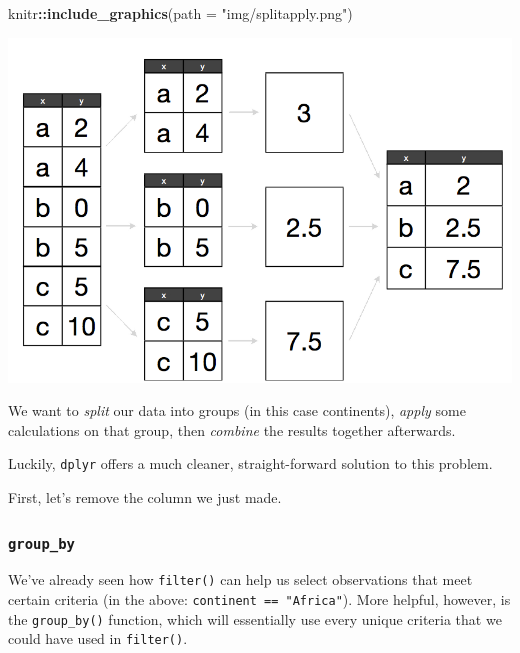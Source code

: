 \documentclass[]{book}
\newenvironment{Shaded}{\begin{snugshade}}{\end{snugshade}}
\newcommand{\KeywordTok}[1]{\textcolor[rgb]{0.13,0.29,0.53}{\textbf{#1}}}
\newcommand{\DataTypeTok}[1]{\textcolor[rgb]{0.13,0.29,0.53}{#1}}
\newcommand{\StringTok}[1]{\textcolor[rgb]{0.31,0.60,0.02}{#1}}
\newcommand{\CommentTok}[1]{\textcolor[rgb]{0.56,0.35,0.01}{\textit{#1}}}
\newcommand{\OtherTok}[1]{\textcolor[rgb]{0.56,0.35,0.01}{#1}}
\newcommand{\OperatorTok}[1]{\textcolor[rgb]{0.81,0.36,0.00}{\textbf{#1}}}
\newcommand{\NormalTok}[1]{#1}
\begin{document}
\begin{Shaded}
\begin{Highlighting}[]
\NormalTok{knitr}\OperatorTok{::}\KeywordTok{include_graphics}\NormalTok{(}\DataTypeTok{path =} \StringTok{"img/splitapply.png"}\NormalTok{)}
\end{Highlighting}
\end{Shaded}

\begin{center}\includegraphics[width=0.7\linewidth]{img/splitapply} \end{center}

We want to \emph{split} our data into groups (in this case continents),
\emph{apply} some calculations on that group, then \emph{combine} the
results together afterwards.

Luckily, \texttt{dplyr} offers a much cleaner, straight-forward solution
to this problem.

First, let's remove the column we just made.

\begin{Shaded}
\end{Shaded}

\subsubsection{\texorpdfstring{\texttt{group\_by}}{group\_by}}\label{group_by}

We've already seen how \texttt{filter()} can help us select observations
that meet certain criteria (in the above:
\texttt{continent\ ==\ "Africa"}). More helpful, however, is the
\texttt{group\_by()} function, which will essentially use every unique
criteria that we could have used in \texttt{filter()}.
\end{document}
